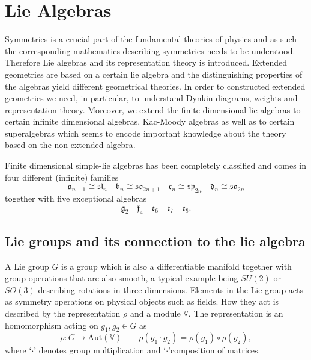 \chapter{Lie Algebras}\label{sec:symmetries}
Symmetries is a crucial part of the fundamental theories of physics and as such the corresponding mathematics describing symmetries needs to be understood. Therefore Lie algebras and its representation theory is introduced. Extended geometries are based on a certain lie algebra and the distinguishing properties of the algebras yield different geometrical theories. In order to constructed extended geometries we need, in particular, to understand Dynkin diagrams, weights and representation theory. Moreover, we extend the finite dimensional lie algebras to certain infinite dimensional algebras, Kac-Moody algebras as well as to certain superalgebras which seems to encode important knowledge about the theory based on the non-extended algebra.

Finite dimensional simple-lie algebras has been completely classified and comes in four different (infinite) families 
\begin{equation}
    \mathfrak{a}_{n-1} \cong \mathfrak{sl}_{n}\quad \mathfrak{b}_{n}\cong \mathfrak{so}_{2n+1}\quad \mathfrak{c}_{n} \cong \mathfrak{sp}_{2n}\quad \mathfrak{d}_{n}\cong \mathfrak{so}_{2n} 
\end{equation}
together with five exceptional algebras 
\begin{equation}
    \mathfrak{g}_2\quad \mathfrak{f}_4 \quad \mathfrak{e_6} \quad \mathfrak{e_7} \quad \mathfrak{e_8}.
\end{equation}


\section{Lie groups and its connection to the lie algebra}
A Lie group $G$ is a group which is also a differentiable manifold together with group operations that are also smooth, a typical example being $SU(2)$ or $SO(3)$ describing rotations in three dimensions. Elements in the Lie group acts as symmetry operations on physical objects such as fields. How they act is described by the representation $\rho$ and a module $\mathbb{V}$. The representation is an homomorphism acting on $g_1,g_2\in G$ as
\begin{equation}
    \rho : G\to \text{Aut}(\mathbb{V}) \qquad \rho(g_1\cdot g_2) = \rho(g_1)\circ\rho(g_2),
\end{equation}
where `$\cdot$' denotes group multiplication and `$\cdot$'composition of matrices. 

